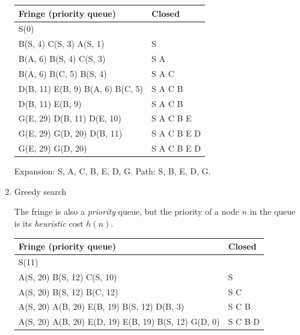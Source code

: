 \documentclass[11pt, a4paper]{article}
\begin{document}
\begin{enumerate}
\begin{solution}
        \begin{table}[h]
            \centering
            \begin{tabular}{l|l}
                \toprule
                Fringe (priority queue) & Closed \\
                \midrule
                S(0) & \\
                B(S, 4) C(S, 3) A(S, 1) & S \\
                B(A, 6) B(S, 4) C(S, 3) & S A \\
                B(A, 6) B(C, 5) B(S, 4) & S A C \\
                D(B, 11) E(B, 9) B(A, 6) B(C, 5) & S A C B \\
                D(B, 11) E(B, 9) & S A C B \\
                G(E, 29) D(B, 11) D(E, 10) & S A C B E \\
                G(E, 29) G(D, 20) D(B, 11) & S A C B E D \\
                G(E, 29) G(D, 20) & S A C B E D \\
                \bottomrule
            \end{tabular}
        \end{table}

        Expansion: S, A, C, B, E, D, G. Path: S, B, E, D, G.
    \end{solution}

    \item Greedy search

    \begin{solution}
        The fringe is also a \emph{priority} queue, but the priority of a node $n$ in the queue is its \emph{heuristic} cost $h(n)$.

        \begin{table}[h]
            \centering
            \begin{tabular}{l|l}
                \toprule
                Fringe (priority queue) & Closed \\
                \midrule
                S(11) & \\
                A(S, 20) B(S, 12) C(S, 10) & S \\
                A(S, 20) B(S, 12) B(C, 12) & S C \\
                A(S, 20) A(B, 20) E(B, 19) B(S, 12) D(B, 3) & S C B \\
                A(S, 20) A(B, 20) E(D, 19) E(B, 19) B(S, 12) G(D, 0) & S C B D \\
                \bottomrule
            \end{tabular}
        \end{table}


\end{solution}
\end{enumerate}
\end{document}
